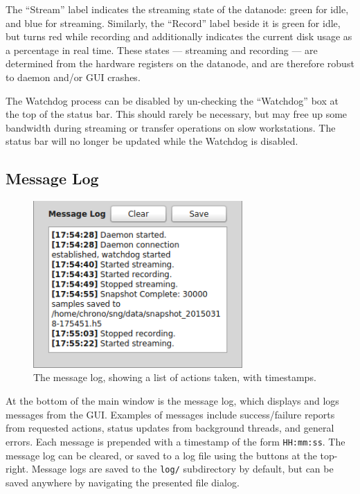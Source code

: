 The ``Stream'' label indicates the streaming state of the datanode: green for idle, and blue for streaming. Similarly, the ``Record'' label beside it is green for idle, but turns red while recording and additionally indicates the current disk usage as a percentage in real time. These states --- streaming and recording --- are determined from the hardware registers on the datanode, and are therefore robust to daemon and/or GUI crashes.

The Watchdog process can be disabled by un-checking the ``Watchdog'' box at the top of the status bar. This should rarely be necessary, but may free up some bandwidth during streaming or transfer operations on slow workstations. The status bar will no longer be updated while the Watchdog is disabled.


\subsection{Message Log}
\label{sec_usage_messagelog}

\begin{figure}[h!]
\begin{center}
\includegraphics[width=8cm]{screenshots/msgLog.png}
\end{center}
\caption{The message log, showing a list of actions taken, with timestamps.}
\label{fig_statusbar}
\end{figure}

At the bottom of the main window is the message log, which displays and logs messages from the GUI. Examples of messages include success/failure reports from requested actions, status updates from background threads, and general errors. Each message is prepended with a timestamp of the form \texttt{HH:mm:ss}. The message log can be cleared, or saved to a log file using the buttons at the top-right. Message logs are saved to the \texttt{log/} subdirectory by default, but can be saved anywhere by navigating the presented file dialog.


